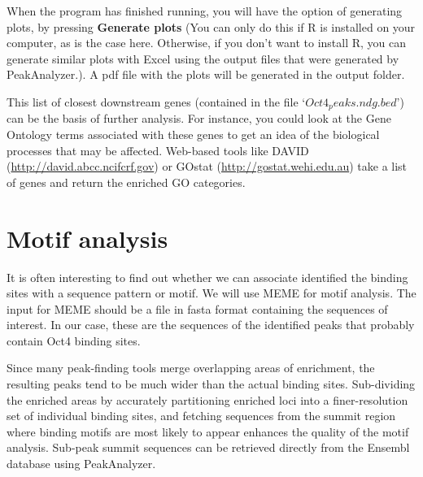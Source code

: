 \begin{information}
When the program has finished running, you will have the option of generating plots, by pressing \textbf{Generate plots} (You can only do this if R is installed on your computer, as is the case here. Otherwise, if you don't want to install R, you can generate similar plots with Excel using the output files that were generated by PeakAnalyzer.). A pdf file with the plots will be generated in the output folder. 
\end{information}

\begin{note}
This list of closest downstream genes (contained in the file `$Oct4_peaks.ndg.bed$') can be the basis of further analysis. For instance, you could look at the Gene Ontology terms associated with these genes to get an idea of the biological processes that may be affected. Web-based tools like DAVID (\url{http://david.abcc.ncifcrf.gov}) or GOstat (\url{http://gostat.wehi.edu.au}) take a list of genes and return the enriched GO categories.
\end{note}


\section{Motif analysis}

\begin{information}
It is often interesting to find out whether we can associate identified the binding sites with a sequence pattern or motif. We will use MEME for motif analysis. The input for MEME should be a file in fasta format containing the sequences of interest. In our case, these are the sequences of the identified peaks that probably contain Oct4 binding sites. 

Since many peak-finding tools merge overlapping areas of enrichment, the resulting peaks tend to be much wider than the actual binding sites. Sub-dividing the enriched areas by accurately partitioning enriched loci into a finer-resolution set of individual binding sites, and fetching sequences from the summit region where binding motifs are most likely to appear enhances the quality of the motif analysis. Sub-peak summit sequences can be retrieved directly from the Ensembl database using PeakAnalyzer.
\end{information}

